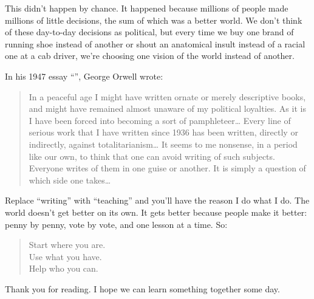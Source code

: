 This didn't happen by chance. It happened because millions of people
made millions of little decisions, the sum of which was a better world.
We don't think of these day-to-day decisions as political, but every
time we buy one brand of running shoe instead of another or shout an
anatomical insult instead of a racial one at a cab driver, we're
choosing one vision of the world instead of another.

In his 1947 essay ``'', George Orwell wrote:

\begin{quote}

In a peaceful age I might have written ornate or merely descriptive
books, and might have remained almost unaware of my political
loyalties. As it is I have been forced into becoming a sort of
pamphleteer{\ldots} Every line of serious work that I have
written since 1936 has been written, directly or indirectly, against
totalitarianism{\ldots} It seems to me nonsense, in a period
like our own, to think that one can avoid writing of such subjects.
Everyone writes of them in one guise or another. It is simply a
question of which side one takes{\ldots}

\end{quote}

Replace ``writing'' with ``teaching'' and you'll have the reason I do what I
do. The world doesn't get better on its own. It gets better because
people make it better: penny by penny, vote by vote, and one lesson at a
time. So:

\begin{quote}

Start where you are.\\
Use what you have.\\
Help who you can.

\end{quote}

Thank you for reading. I hope we can learn something together some day.
